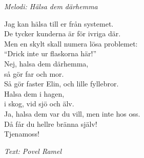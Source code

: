 {\footnotesize\textit{Melodi: Hälsa dem därhemma}}\par
\vspace{10pt}
Jag kan hälsa till er från systemet.\\
De tycker kunderna är för ivriga där.\\
Men en skylt skall numera lösa problemet:\\
``Drick inte ur flaskorna här!''\\
Nej, halsa dem därhemma,\\
så gör far och mor.\\
Så gör faster Elin, och lille fyllebror.\\
Halsa dem i hagen,\\
i skog, vid sjö och älv.\\
Ja, halsa dem var du vill, men inte hos oss.\\
Då får du hellre bränna själv!\\
Tjenamoss!\par
\vspace{10pt}
{\footnotesize\textit{Text: Povel Ramel}}

